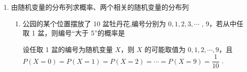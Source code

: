 \begin{enumerate}
\begin{enumerate}
\begin{jieda}
            所以 $\dfrac{a}{1 \times  2} + \dfrac{a}{2 \times  3} + \dfrac{a}{3 \times  4} = a\left( {1 - \dfrac{1}{2} + \dfrac{1}{2} - \dfrac{1}{3} + \dfrac{1}{3} - \dfrac{1}{4}}\right)  = a\left( {1 - \dfrac{1}{4}}\right)  = 1$ ,
            
            所以 $a = \dfrac{4}{3}$ .
        \end{jieda}

        
        \item 已知随机变量 $X$ 的分布列为$P\left( {X = n}\right)  = \dfrac{a}{\left( {n + 1}\right) \left( {n + 2}\right) },\left( {n = 0,1,2}\right)$ ,其中 $a$ 是常数,则下列说法不正确的是
        \begin{jieda}
            由 $P\left( {X = n}\right)  = \dfrac{a}{\left( {n + 1}\right) \left( {n + 2}\right) },\left( {n = 0,1,2}\right)$ ,
            
            得 $P\left( {X = 0}\right)  + P\left( {X = 1}\right)  + P\left( {X = 2}\right)  = 1$ ,
            
            即 $\dfrac{a}{2} + \dfrac{a}{6} + \dfrac{a}{12} = 1$ ，解得 $a = \dfrac{4}{3}$ ，故 ${{AB}}$ 正确；
            
            $P\left( {0 \leq  X < 2}\right)  = P\left( {X = 0}\right)  + P\left( {X = 1}\right)  = \dfrac{2}{3} + \dfrac{2}{9} = \dfrac{8}{9}$ 故 C 正确；
            
            $P\left( {X \geq  1}\right)  = P\left( {X = 1}\right)  + P\left( {X = 2}\right)  = \dfrac{2}{9} + \dfrac{1}{9} = \dfrac{1}{3}$ ，故 D 错误.
        \end{jieda}
        
    \end{enumerate}
    \item 由随机变量的分布列求概率、两个相关的随机变量的分布列
    \begin{enumerate}
         \item 公园的某个位置摆放了 10 盆牡丹花,编号分别为 $0,1,2,3,\cdots$ , 9，若从中任取 1 盆，则编号“大于 5”的概率是
         \begin{jieda}
             设任取 1 盆的编号为随机变量 $X$，则 $X$ 的可能取值为 $0,1,2,\cdots ,9$，且 $P\left( {X = 0}\right)  = P\left( {X = 1}\right)  = P\left( {X = 2}\right)  = \cdots  = P\left( {X = 9}\right)  = \dfrac{1}{10}$ .
            

\end{jieda}
\end{enumerate}
\end{enumerate}
